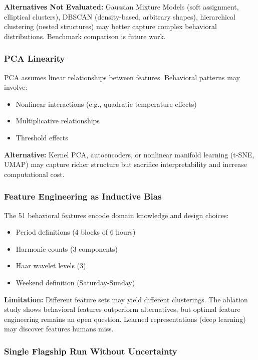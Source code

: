 \textbf{Alternatives Not Evaluated:} Gaussian Mixture Models (soft assignment, elliptical clusters), DBSCAN (density-based, arbitrary shapes), hierarchical clustering (nested structures) may better capture complex behavioral distributions. Benchmark comparison is future work.

\subsubsection{PCA Linearity}

PCA assumes linear relationships between features. Behavioral patterns may involve:
\begin{itemize}
    \item Nonlinear interactions (e.g., quadratic temperature effects)
    \item Multiplicative relationships
    \item Threshold effects
\end{itemize}

\textbf{Alternative:} Kernel PCA, autoencoders, or nonlinear manifold learning (t-SNE, UMAP) may capture richer structure but sacrifice interpretability and increase computational cost.

\subsubsection{Feature Engineering as Inductive Bias}

The 51 behavioral features encode domain knowledge and design choices:
\begin{itemize}
    \item Period definitions (4 blocks of 6 hours)
    \item Harmonic counts (3 components)
    \item Haar wavelet levels (3)
    \item Weekend definition (Saturday-Sunday)
\end{itemize}

\textbf{Limitation:} Different feature sets may yield different clusterings. The ablation study shows behavioral features outperform alternatives, but optimal feature engineering remains an open question. Learned representations (deep learning) may discover features humans miss.

\subsubsection{Single Flagship Run Without Uncertainty}

